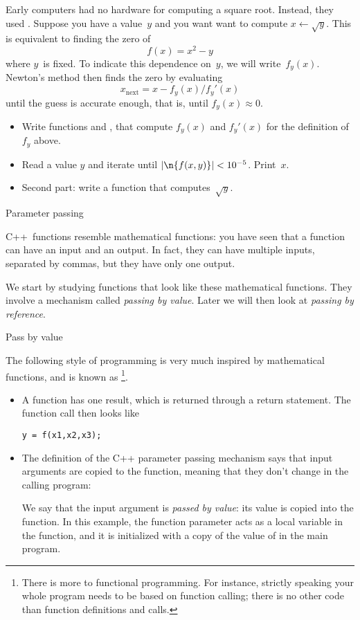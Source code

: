 \begin{exercise}
  \label{ex:newton-root}
  Early computers had no hardware for computing a square
  root. Instead, they used . Suppose you
  have a value~$y$ and you want want to compute
  $x\leftarrow\sqrt{y}$. This is equivalent to finding the zero of
  \[ f(x) = x^2-y \] where $y$~is fixed. To indicate this dependence
  on~$y$, we will write~$f_y(x)$. Newton's method then finds the zero by
  evaluating
  \[ x_{\mathrm{next}}=x-f_y(x)/f_y'(x) \]
  until the guess is accurate enough, that is, until $f_y(x)\approx0$.
  \begin{itemize}
  \item Write functions  and , that compute
    $f_y(x)$ and $f_y'(x)$ for the definition of $f_y$ above.
  \item Read a value $y$ and iterate until $|\n{f(x,y)}|<10^{-5}$. Print~$x$.
  \item Second part: write a function  that computes~$\sqrt{y}$.
  \end{itemize}
\end{exercise}

 {Parameter passing}
\label{sec:passing}

C++~functions resemble mathematical functions: you have seen that a
function can have an input and an output. In fact, they can have
multiple inputs, separated by commas, but they have only one output.

We start by studying functions that look like these mathematical
functions. They involve a  mechanism
called
\emph{passing by value}.
%
Later we will then look at
\emph{passing by reference}.

 {Pass by value}

The following style of programming is very much inspired by
mathematical functions, and is known as \footnote {There is more to functional programming. For
  instance, strictly speaking your whole program needs to be based on
  function calling; there is no other code than function definitions
  and calls.}.
\begin{itemize}
\item A function has one result, which is returned through a return
  statement. The function call then looks like
\begin{verbatim}
y = f(x1,x2,x3);
\end{verbatim}
\item The definition of the C++ parameter passing mechanism says that
  input arguments are copied to the function, meaning that they don't
  change in the calling program:

  We say that the input argument is
  \emph{passed by value}: its value is
  copied into the function.
  In this example, the function parameter  acts as a local
  variable in the function, and it is initialized with a copy of the
  value of  in the main program.
\end{itemize}

